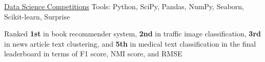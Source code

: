 \begin{cventries}
  \cventryprojects
    {\href{https://github.com/k-chuang/data-science-competitions}{Data Science Competitions}} %
    {Tools: Python, SciPy, Pandas, NumPy, Seaborn, Scikit-learn, Surprise} %
    {
      \begin{cvitems} %
        \item {Ranked \textbf{1st} in book recommender system, \textbf{2nd} in traffic image classification, \textbf{3rd} in news article text clustering, and \textbf{5th} in medical text classification in the final leaderboard in terms of F1 score, NMI score, and RMSE}
      \end{cvitems}
    }



\end{cventries}
